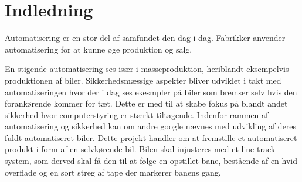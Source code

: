 \section{Indledning}

Automatisering er en stor del af samfundet den dag i dag. Fabrikker anvender automatisering for at kunne øge produktion og salg.

En stigende automatisering ses især i masseproduktion, heriblandt eksempelvis produktionen af biler. \newline
Sikkerhedsmæssige aspekter bliver udviklet i takt med automatiseringen hvor der i dag ses ekesmpler på biler som bremser selv hvis den forankørende kommer for tæt. 
Dette er med til at skabe fokus på blandt andet sikkerhed hvor computerstyring er stærkt tiltagende. Indenfor rammen af automatisering og sikkerhed kan om andre google nævnes med udvikling af deres fuldt automatiseret biler.
\newline
\newline
Dette projekt handler om at fremstille et automatiseret produkt i form af en selvkørende bil. Bilen skal injusteres med et line track system, som derved skal få den til at følge en opstillet bane, bestående af en hvid overflade og en sort streg af tape der markerer banens gang.\newline
